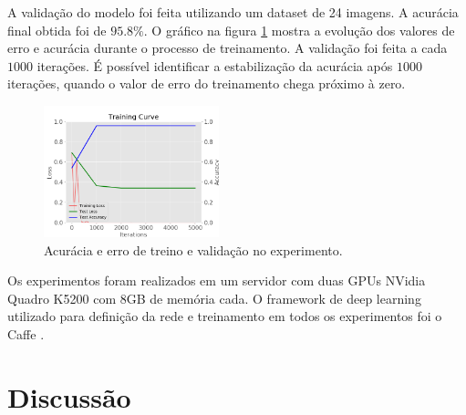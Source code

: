 \documentclass[conference]{IEEEtran}
\begin{document}

  A validação do modelo foi feita utilizando um dataset de 24 imagens. A acurácia final obtida foi de $95.8\%$. O gráfico na figura \ref{fig:acuracia_vgg16_transfer} mostra a evolução dos valores de erro e acurácia durante o processo de treinamento. A validação foi feita a cada $1000$ iterações. É possível identificar a estabilização da acurácia após $1000$ iterações, quando o valor de erro do treinamento chega próximo à zero.

  \begin{figure}[!tp]
    \centering
    \includegraphics[width=2in]{img/curve_vgg16.png}
    \caption{Acurácia e erro de treino e validação no experimento.}
    \label{fig:acuracia_vgg16_transfer}
  \end{figure}



  Os experimentos foram realizados em um servidor com duas GPUs NVidia Quadro K5200 com 8GB de memória cada. O framework de deep learning utilizado para definição da rede e treinamento em todos os experimentos foi o Caffe \cite{jia2014caffe}.

\section{Discussão}
\end{document}

